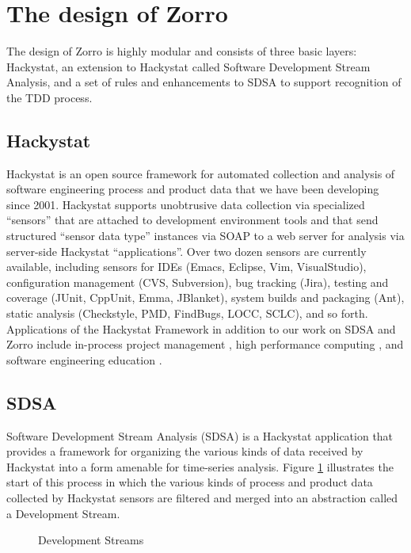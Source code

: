\documentclass[runningheads]{llncs}
\begin{document}
\section{The design of Zorro}
\label{sec:sdsa}

The design of Zorro is highly modular and consists of three basic layers:
Hackystat, an extension to Hackystat called Software Development Stream Analysis,
and a set of rules and enhancements to SDSA to support recognition of the TDD process.

\subsection{Hackystat}

Hackystat is an open source framework for automated collection and analysis
of software engineering process and product data that we have been
developing since 2001. Hackystat supports unobtrusive data collection via
specialized ``sensors'' that are attached to development environment tools
and that send structured ``sensor data type'' instances via SOAP to a web
server for analysis via server-side Hackystat ``applications''. Over two
dozen sensors are currently available, including sensors for IDEs (Emacs,
Eclipse, Vim, VisualStudio), configuration management (CVS, Subversion),
bug tracking (Jira), testing and coverage (JUnit, CppUnit, Emma, JBlanket),
system builds and packaging (Ant), static analysis (Checkstyle, PMD,
FindBugs, LOCC, SCLC), and so forth.  Applications of the Hackystat
Framework in addition to our work on SDSA and Zorro include in-process project
management \cite{csdl2-04-11}, high performance computing
\cite{csdl2-04-22}, and software engineering education \cite{csdl2-03-12}.

\subsection{SDSA}

Software Development Stream Analysis (SDSA) is a Hackystat application that
provides a framework for organizing the various kinds of data received by
Hackystat into a form amenable for time-series analysis.  Figure
\ref{fig:Streaming} illustrates the start of this process in which the
various kinds of process and product data collected by Hackystat sensors
are filtered and merged into an abstraction called a Development Stream.

\begin{figure}[ht]
  \centerline{}
  \caption{Development Streams}
  \label{fig:Streaming}
\end{figure} 
\end{document}
